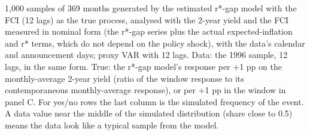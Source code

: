 \begin{table}[p]
\par\smallskip\parbox{0.95\linewidth}{\scriptsize 1,000 samples of 369 months generated by the estimated r*-gap model with the FCI (12 lags) as the true process, analysed with the 2-year yield and the FCI measured in nominal form (the r*-gap series plus the actual expected-inflation and r* terms, which do not depend on the policy shock), with the data's calendar and announcement days; proxy VAR with 12 lags. Data: the 1996 sample, 12 lags, in the same form. True: the r*-gap model's response per +1 pp on the monthly-average 2-year yield (ratio of the window response to its contemporaneous monthly-average response), or per +1 pp in the window in panel C. For yes/no rows the last column is the simulated frequency of the event. A data value near the middle of the simulated distribution (share close to 0.5) means the data look like a typical sample from the model.}
\end{table}
